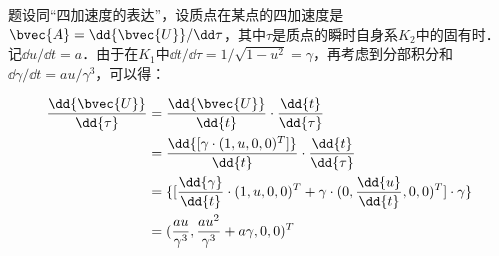 题设同“四加速度的表达”，设质点在某点的四加速度是$\bvec{A}=\dd{\bvec{U}}/\dd\tau$，其中$\tau$是质点的瞬时自身系$K_2$中的固有时．记$\dd{u}/\dd{t}=a$．由于在$K_1$中$\dd{t}/\dd{\tau}=1/\sqrt{1-u^2}=\gamma$，再考虑到分部积分和$\dd{\gamma}/\dd{t}=au/\gamma^3$，可以得：

\begin{equation}
\begin{aligned}
%
\frac{\dd{\bvec{U}}}{\dd{\tau}}&=\frac{\dd{\bvec{U}}}{\dd{t}}\cdot\frac{\dd{t}}{\dd{\tau}}\\&=\frac{\dd{[\gamma\cdot(1,u,0,0)^T]}}{\dd{t}}\cdot\frac{\dd{t}}{\dd{\tau}}\\&=\{[\frac{\dd{\gamma}}{\dd{t}}\cdot(1,u,0,0)^T+\gamma\cdot(0,\frac{\dd{u}}{\dd{t}}, 0,0)^T]\cdot\gamma\}\\&=(\frac{au}{\gamma^3},\frac{au^2}{\gamma^3}+a\gamma,0,0)^T
%
\end{aligned}
\end{equation}



